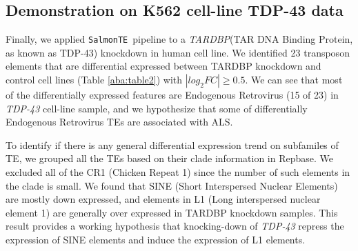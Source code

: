 \documentclass{ws-procs11x85}
\newcommand{\SalmonTE}{\texttt{SalmonTE}}
\begin{document}
\subsection{Demonstration on K562 cell-line TDP-43 data}

Finally, we applied \SalmonTE~pipeline to a \textit{TARDBP}(TAR DNA Binding Protein, as known as TDP-43) knockdown in human cell line. 
We identified 23 transposon elements that are differential expressed between TARDBP knockdown and control cell lines (Table \ref{aba:table2}) with $|log_{2}FC| \geq 0.5$. 
We can see that most of the differentially expressed features are Endogenous Retrovirus (15 of 23) in \textit{TDP-43} cell-line sample, and 
we hypothesize that some of differentially Endogenous Retrovirus TEs are associated with ALS.

To identify if there is any general differential expression trend on subfamiles of TE, we grouped all the TEs based on their clade information in Repbase. We excluded all of the CR1 (Chicken Repeat 1) since the number of such elements in the clade is small.
We found that SINE (Short Interspersed Nuclear Elements) are mostly down expressed,
and elements in L1 (Long interspersed nuclear element 1) are generally over expressed in TARDBP knockdown samples. 
This result provides a working hypothesis that knocking-down of \textit{TDP-43}  repress the expression of SINE elements and induce the expression of L1 elements.
\end{document}
